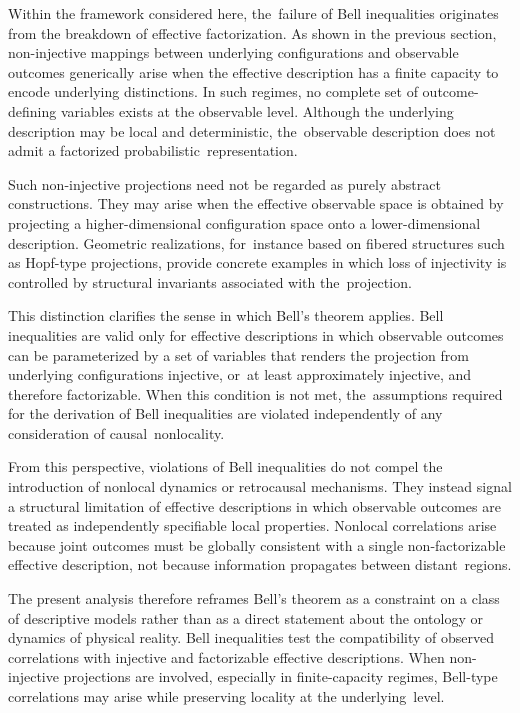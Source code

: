 \documentclass[11pt,a4paper]{article}
\theoremstyle{remark}
\begin{document}
  Within the framework considered here, the~failure of Bell inequalities originates
  from the breakdown of effective factorization.
  As shown in the previous section, non-injective mappings between underlying
  configurations and observable outcomes generically arise when the effective
  description has a finite capacity to encode underlying distinctions.
  In such regimes, no complete set of outcome-defining variables exists at the
  observable level.
  Although the underlying description may be local and deterministic, the~observable
  description does not admit a factorized probabilistic~representation.

  Such non-injective projections need not be regarded as purely abstract constructions.
  They may arise when the effective observable space is obtained by projecting a
  higher-dimensional configuration space onto a lower-dimensional description.
  Geometric realizations, for~instance based on fibered structures such as Hopf-type
  projections, provide concrete examples in which loss of injectivity is controlled
  by structural invariants associated with the~projection.

  This distinction clarifies the sense in which Bell’s theorem applies.
  Bell inequalities are valid only for effective descriptions in which observable
  outcomes can be parameterized by a set of variables that renders the projection from
  underlying configurations injective, or~at least approximately injective, and therefore factorizable.
  When this condition is not met, the~assumptions required for the derivation of Bell
  inequalities are violated independently of any consideration of causal~nonlocality.

  From this perspective, violations of Bell inequalities do not compel the introduction
  of nonlocal dynamics or retrocausal mechanisms.
  They instead signal a structural limitation of effective descriptions in which
  observable outcomes are treated as independently specifiable local properties.
  Nonlocal correlations arise because joint outcomes must be globally consistent with a
  single non-factorizable effective description, not because information propagates
  between distant~regions.

  The present analysis therefore reframes Bell’s theorem as a constraint on a class of
  descriptive models rather than as a direct statement about the ontology or dynamics of physical reality.
  Bell inequalities test the compatibility of observed correlations with injective and
  factorizable effective descriptions.
  When non-injective projections are involved, especially in finite-capacity regimes,
  Bell-type correlations may arise while preserving locality at the underlying~level.
\end{document}
